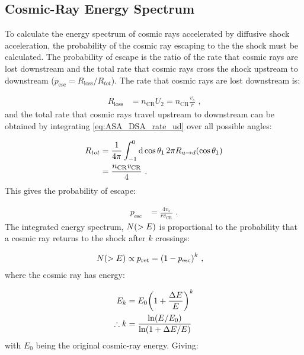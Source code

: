 \subsection{Cosmic-Ray Energy Spectrum}

To calculate the energy spectrum of cosmic rays accelerated by diffusive shock acceleration, the probability of the cosmic ray escaping to the the shock must be calculated. The probability of escape is the ratio of the rate that cosmic rays are lost downstream and the total rate that cosmic rays cross the shock upstream to downstream ($p_\text{esc}=R_\text{loss}/R_{tot}$). The rate that cosmic rays are lost downstream is:

\begin{equation}
    \begin{aligned}
        R_\text{loss}&=n_\text{CR}U_2=n_\text{CR}\frac{v_s}{r}\text{ ,}
    \end{aligned}
\end{equation}
\noindent and the total rate that cosmic rays travel upstream to downstream can be obtained by integrating \autoref{eq:ASA_DSA_rate_ud} over all possible angles:

\begin{equation}
    \begin{aligned}
        R_{tot}&=\frac{1}{4\pi}\int_{-1}^0\dd{\cos\theta_1}2\pi R_{u\rightarrow d}\qty(\cos\theta_1) \\
        &=\frac{n_\text{CR}v_\text{CR}}{4} \text{ .}
    \end{aligned}
\end{equation}
\noindent This gives the probability of escape:

\begin{equation}
    \begin{aligned}
        p_\text{esc}&=\frac{4v_s}{rv_\text{CR}} \text{ .}
    \end{aligned}
\end{equation}
\noindent The integrated energy spectrum, $N\qty(>E)$ is proportional to the probability that a cosmic ray returns to the shock after $k$ crossings:

\begin{equation}
    \begin{aligned}
        N\qty(>E)\propto p_\text{ret}&=\qty(1-p_\text{esc})^k \text{ ,}
    \end{aligned}
\end{equation}
\noindent where the cosmic ray has energy:

\begin{equation}
    \begin{aligned}
        E_k&=E_0\qty(1+\frac{\Delta E}{E})^k \\
        \therefore k&=\frac{\ln(E/E_0)}{\ln(1+\Delta E/E)}
    \end{aligned}
\end{equation}
\noindent with $E_0$ being the original cosmic-ray energy. Giving:


